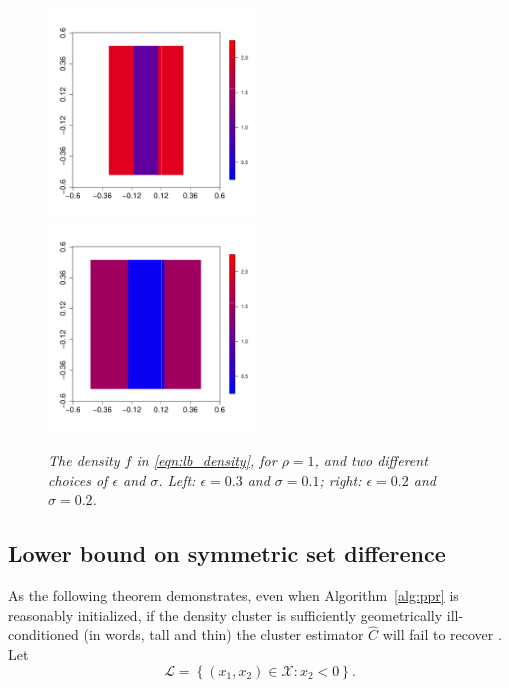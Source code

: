 \documentclass[11pt,twoside]{article}
\newcommand{\set}[1]{\left\{#1\right\}}
\newcommand{\1}{\mathbf{1}}
\newcommand{\mc}[1]{\mathcal{#1}}
\newcommand{\wh}[1]{\widehat{#1}}
\begin{document}
\begin{figure}[tb]
	\centering
	\includegraphics[width=0.495\textwidth]{plots/lower_bound/lower_bound_1}
	\includegraphics[width=0.495\textwidth]{plots/lower_bound/lower_bound_2}
	\caption{\it\small The density $f$ in \eqref{eqn:lb_density}, for
		$\rho=1$, and two different choices of $\epsilon$ and $\sigma$. Left:
		$\epsilon = 0.3$ and $\sigma = 0.1$; right: $\epsilon = 0.2$ and 
		$\sigma = 0.2$.} 
	\label{fig:hard_case}
\end{figure}

\subsection{Lower bound on symmetric set difference}
As the following theorem demonstrates, even when Algorithm~\ref{alg:ppr} is
reasonably initialized, if the density cluster \smash{$\mc{C}^{(1)}$} is 
sufficiently geometrically ill-conditioned (in words, tall and thin) the cluster 
estimator $\wh{C}$ will fail to recover \smash{$\mc{C}^{(1)}$}. Let
\begin{equation}
\label{eqn:lower_set}
\mathcal{L} = \set{(x_1,x_2) \in \mathcal{X}: x_2 < 0}.
\end{equation}
\end{document}
